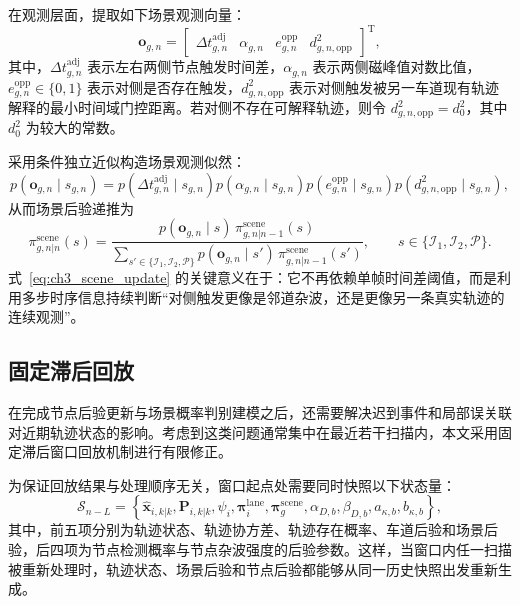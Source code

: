 \documentclass{xdupgthesis}
\begin{document}
在观测层面，提取如下场景观测向量：
\begin{equation}
	\mathbf o_{g,n}=
	\begin{bmatrix}
		\Delta t_{g,n}^{\mathrm{adj}} &
		\alpha_{g,n} &
		e_{g,n}^{\mathrm{opp}} &
		d_{g,n,\mathrm{opp}}^2
	\end{bmatrix}^{\mathrm T},
	\label{eq:ch3_scene_obs}
\end{equation}
其中，$\Delta t_{g,n}^{\mathrm{adj}}$ 表示左右两侧节点触发时间差，$\alpha_{g,n}$ 表示两侧磁峰值对数比值，$e_{g,n}^{\mathrm{opp}}\in\{0,1\}$ 表示对侧是否存在触发，$d_{g,n,\mathrm{opp}}^2$ 表示对侧触发被另一车道现有轨迹解释的最小时间域门控距离。若对侧不存在可解释轨迹，则令 $d_{g,n,\mathrm{opp}}^2=d_0^2$，其中 $d_0^2$ 为较大的常数。

采用条件独立近似构造场景观测似然：
\begin{equation}
	p(\mathbf o_{g,n}\mid s_{g,n})=
	p(\Delta t_{g,n}^{\mathrm{adj}}\mid s_{g,n})
	p(\alpha_{g,n}\mid s_{g,n})
	p(e_{g,n}^{\mathrm{opp}}\mid s_{g,n})
	p(d_{g,n,\mathrm{opp}}^2\mid s_{g,n}),
	\label{eq:ch3_scene_likelihood}
\end{equation}
从而场景后验递推为
\begin{equation}
	\pi_{g,n|n}^{\mathrm{scene}}(s)=
	\frac{
		p(\mathbf o_{g,n}\mid s)\,
		\pi_{g,n|n-1}^{\mathrm{scene}}(s)
	}{
		\sum_{s'\in\{\mathcal I_1,\mathcal I_2,\mathcal P\}}
		p(\mathbf o_{g,n}\mid s')\,
		\pi_{g,n|n-1}^{\mathrm{scene}}(s')
	},
	\qquad
	s\in\{\mathcal I_1,\mathcal I_2,\mathcal P\}.
	\label{eq:ch3_scene_update}
\end{equation}
式~\eqref{eq:ch3_scene_update} 的关键意义在于：它不再依赖单帧时间差阈值，而是利用多步时序信息持续判断“对侧触发更像是邻道杂波，还是更像另一条真实轨迹的连续观测”。

\subsection{固定滞后回放}

在完成节点后验更新与场景概率判别建模之后，还需要解决迟到事件和局部误关联对近期轨迹状态的影响。考虑到这类问题通常集中在最近若干扫描内，本文采用固定滞后窗口回放机制进行有限修正。

为保证回放结果与处理顺序无关，窗口起点处需要同时快照以下状态量：
\begin{equation}
	\mathcal S_{n-L}=
	\left\{
	\hat{\mathbf x}_{i,k|k},
	\mathbf P_{i,k|k},
	\psi_i,
	\boldsymbol\pi_i^{\mathrm{lane}},
	\boldsymbol\pi_g^{\mathrm{scene}},
	\alpha_{D,b},\beta_{D,b},a_{\kappa,b},b_{\kappa,b}
	\right\},
	\label{eq:ch3_snapshot}
\end{equation}
其中，前五项分别为轨迹状态、轨迹协方差、轨迹存在概率、车道后验和场景后验，后四项为节点检测概率与节点杂波强度的后验参数。这样，当窗口内任一扫描被重新处理时，轨迹状态、场景后验和节点后验都能够从同一历史快照出发重新生成。
\end{document}
